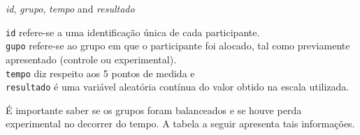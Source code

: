 \documentclass[
]{book}
\newenvironment{Shaded}{\begin{snugshade}}{\end{snugshade}}
\newcommand{\KeywordTok}[1]{\textcolor[rgb]{0.13,0.29,0.53}{\textbf{#1}}}
\newcommand{\NormalTok}[1]{#1}
\newcommand{\OperatorTok}[1]{\textcolor[rgb]{0.81,0.36,0.00}{\textbf{#1}}}
\newcommand{\StringTok}[1]{\textcolor[rgb]{0.31,0.60,0.02}{#1}}
\begin{document}
\emph{id}, \emph{grupo}, \emph{tempo} and \emph{resultado}

\texttt{id} refere-se a uma identificação única de cada participante.\\
\texttt{gupo} refere-se ao grupo em que o participante foi alocado, tal como previamente apresentado (controle ou experimental).\\
\texttt{tempo} diz respeito aos 5 pontos de medida e\\
\texttt{resultado} é uma variável aleatória contínua do valor obtido na escala utilizada.

É importante saber se os grupos foram balanceados e se houve perda experimental no decorrer do tempo. A tabela a seguir apresenta tais informações.

\begin{Shaded}
\end{Shaded}
\end{document}
